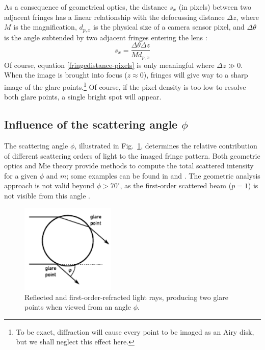\documentclass[11.5pt,oneside]{book}
\newcommand*{\figref}[1]{Fig.~\ref{#1}}
\begin{document}
As a consequence of geometrical optics, the distance $s_x$ (in pixels) between two
adjacent fringes has a linear relationship with the defocussing distance $\Delta
z$, where $M$ is the magnification, $d_{p,x}$ is the physical size of a
camera sensor pixel, and $\Delta \theta$ is the angle subtended by two adjacent
fringes entering the lens \cite{Pan06}:
\begin{equation}
  s_x = \frac{\Delta \theta \Delta z}{M d_{p,x}} 
  \label{fringedistance-pixels}
\end{equation}
Of course, equation \eqref{fringedistance-pixels} is only meaningful where $\Delta z \gg
0$. When the image is brought into focus ($z\approx 0$), fringes will give way to a sharp
image of the glare points.\footnote{To be exact, diffraction will
cause every point to be imaged as an Airy disk, but we shall neglect
this effect here.} Of course, if the pixel density is too low to resolve
both glare points, a single bright spot will appear. 

\subsection{Influence of the scattering angle $\phi$}
The scattering angle $\phi$, illustrated in \figref{fig:droplet-rays}, determines the
relative contribution of different scattering orders of light to the imaged
fringe pattern. Both geometric optics \cite{Vandehulst12} and Mie theory provide
methods to compute the total scattered intensity for a given $\phi$ and $m$;
some examples can be found in \citet{Kawaguchi02} and \citet{Mounaim99}. The
geometric analysis approach is not valid beyond $\phi > 70^\circ$, as the
first-order scattered beam ($p=1$) is not visible from this angle
\cite{Glover95}.

\begin{figure}
\centering
\includegraphics[width=0.4\textwidth]{img/setup/droplet_rays.pdf}
\caption{Reflected and first-order-refracted light rays, producing two glare
points when viewed from an angle $\phi$. \label{fig:droplet-rays}}
\end{figure}
\end{document}
